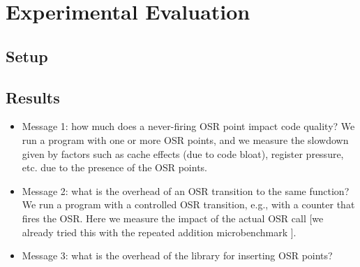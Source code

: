 \section{Experimental Evaluation}
\label{se:experiments}

\subsection{Setup}

\subsection{Results}

\begin{itemize}
\item Message 1: how much does a never-firing OSR point impact code quality? We run a program with one or more OSR points, and we measure the slowdown given by factors such as cache effects (due to code bloat), register pressure, etc. due to the presence of the OSR points.
\item Message 2: what is the overhead of an OSR transition to the same function? We run a program with a controlled OSR transition, e.g., with a counter that fires the OSR. Here we measure the impact of the actual OSR call [we already tried this with the repeated addition microbenchmark ].
\item Message 3: what is the overhead of the library for inserting OSR points?
\end{itemize}


  